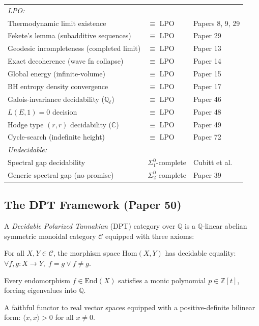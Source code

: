 \documentclass[11pt,a4paper]{article}
\begin{document}
\begin{center}
\begin{longtable}{@{}p{5.8cm}ll@{}}
\midrule
\multicolumn{3}{l}{\textit{LPO:}} \\
Thermodynamic limit existence & $\equiv$ LPO & Papers 8, 9, 29 \\
Fekete's lemma (subadditive sequences) & $\equiv$ LPO & Paper 29 \\
Geodesic incompleteness (completed limit) & $\equiv$ LPO & Paper 13 \\
Exact decoherence (wave fn collapse) & $\equiv$ LPO & Paper 14 \\
Global energy (infinite-volume) & $\equiv$ LPO & Paper 15 \\
BH entropy density convergence & $\equiv$ LPO & Paper 17 \\
Galois-invariance decidability ($\mathbb{Q}_\ell$) & $\equiv$ LPO & Paper 46 \\
$L(E,1)=0$ decision & $\equiv$ LPO & Paper 48 \\
Hodge type $(r,r)$ decidability ($\mathbb{C}$) & $\equiv$ LPO & Paper 49 \\
Cycle-search (indefinite height) & $\equiv$ LPO & Paper 72 \\
\midrule
\multicolumn{3}{l}{\textit{Undecidable:}} \\
Spectral gap decidability & $\Sigma_1^0$-complete & Cubitt et al. \\
Generic spectral gap (no promise) & $\Sigma_2^0$-complete & Paper 39 \\
\bottomrule
\end{longtable}
\end{center}

\subsection*{The DPT Framework (Paper 50)}

A \emph{Decidable Polarized Tannakian} (DPT) category over $\mathbb{Q}$ is a $\mathbb{Q}$-linear abelian symmetric monoidal category $\mathcal{C}$ equipped with three axioms:

\begin{description}[style=unboxed,leftmargin=1em]
\item[Axiom 1 (Decidable morphisms --- Standard Conjecture D).] For all $X, Y \in \mathcal{C}$, the morphism space $\mathrm{Hom}(X,Y)$ has decidable equality: $\forall f,g\colon X \to Y,\; f = g \lor f \neq g$.

\item[Axiom 2 (Algebraic spectrum).] Every endomorphism $f \in \mathrm{End}(X)$ satisfies a monic polynomial $p \in \mathbb{Z}[t]$, forcing eigenvalues into $\overline{\mathbb{Q}}$.

\item[Axiom 3 (Archimedean polarization).] A faithful functor to real vector spaces equipped with a positive-definite bilinear form: $\langle x, x \rangle > 0$ for all $x \neq 0$.
\end{description}
\end{document}
